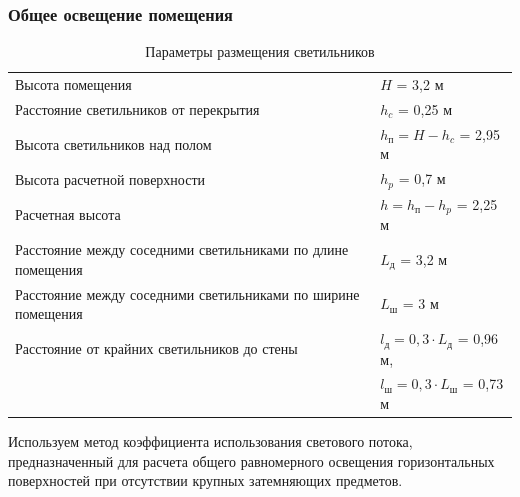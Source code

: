 \subsubsection{Общее освещение помещения}

\begin{table}[ht]
    \begin{tabular}{l|l}
        \hline
        Высота помещения                                                        & $H$ = 3,2 м                                   \\
        Расстояние светильников от перекрытия                                   & $h_c$ = 0,25 м                                \\
        Высота светильников над полом                                           & $h_\text{п} = H - h_c$ = 2,95 м               \\
        Высота расчетной поверхности                                            & $h_p$ = 0,7 м                                 \\
        Расчетная высота                                                        & $h = h_\text{п} - h_p$ = 2,25 м               \\
        Расстояние между соседними светильниками по длине помещения             & $L_\text{д}$ = 3,2 м                          \\
        Расстояние между соседними светильниками по ширине помещения            & $L_\text{ш}$ = 3 м                            \\
        Расстояние от крайних светильников до стены                             & $l_\text{д} = 0,3 \cdot L_\text{д}$ = 0,96 м, \\
                                                                                & $l_\text{ш} = 0,3 \cdot L_\text{ш}$ = 0,73 м  \\
        \hline
    \end{tabular}
    \caption{Параметры размещения светильников}
    \label{lamps_arrangement_parameters}
\end{table}

Используем метод коэффициента использования светового потока, предназначенный для
расчета общего равномерного освещения горизонтальных поверхностей при отсутствии
крупных затемняющих предметов.

